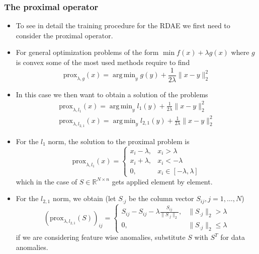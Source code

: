 \documentclass{beamer}
\theoremstyle{plain}
\theoremstyle{definition}
\theoremstyle{remark}
\newcommand{\R}{\mathbb{R}}
\newcommand{\norm}[1]{\lVert#1\rVert}
\newcommand{\prox}{\text{prox}}
\DeclareMathOperator*{\argmin}{arg\,min}
\begin{document}
\begin{frame}
	\frametitle{The proximal operator}
	\begin{itemize}
		\item To see in detail the training procedure for the RDAE we first need to consider the proximal operator.
		\item For general optimization problems of the form $\min f(x)+\lambda g(x)$ where $g$ is convex some of the most used methods require to find
			\begin{equation}
				\prox_{\lambda, g}(x) = \argmin_{y}{g(y)+\frac{1}{2\lambda}\norm{x-y}_{2}^{2}}
			\end{equation}
		\item In this case we then want to obtain a solution of the problems
			\begin{align}
				\prox_{\lambda, l_1}(x) = \argmin_{y}{l_1(y)+\frac{1}{2\lambda}\norm{x-y}_{2}^{2}}\\
				\prox_{\lambda, l_{2,1}}(x) = \argmin_{y}{l_{2,1}(y)+\frac{1}{2\lambda}\norm{x-y}_{2}^{2}}
			\end{align}
	\end{itemize}
\end{frame}

\begin{frame}
	\begin{itemize}
		\item For the $l_1$ norm, the solution to the proximal problem is
			\begin{equation}
				\prox_{\lambda, l_1}(x) = \begin{cases}
					x_i - \lambda, & x_i>\lambda\\
					x_i + \lambda, & x_i<-\lambda\\
					0, & x_i\in[-\lambda, \lambda]
				\end{cases}
			\end{equation}
			which in the case of $S\in\R^{N\times n}$ gets applied element by element.
		\item For the $l_{2,1}$ norm, we obtain (let $S_{\cdot j}$ be the column vector $S_{ij}, j=1, \ldots, N$)
			\begin{equation}
				(\prox_{\lambda, l_{2,1}}(S))_{ij} = \begin{cases}
					S_{ij}-S_{ij} - \lambda\frac{S_{ij}}{\norm{S_{\cdot j}}_{2}}, & \norm{S_{\cdot j}}_{2} > \lambda\\
					0, & \norm{S_{\cdot j}}_{2} \leq \lambda
				\end{cases}
			\end{equation}
			if we are considering feature wise anomalies, substitute $S$ with $S^T$ for data anomalies.
	\end{itemize}
\end{frame}
\end{document}
